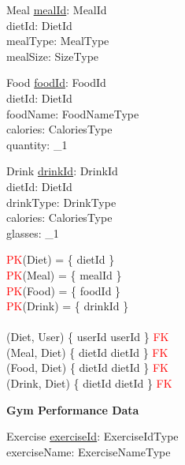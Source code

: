 \documentclass{article}
\begin{document}
\begin{schema}{Meal}
	\underline{mealId}: MealId \\
    dietId: DietId \\
    mealType: MealType \\
    mealSize: SizeType \\
\end{schema}

\begin{schema}{Food}
	\underline{foodId}: FoodId \\
    dietId: DietId \\
    foodName: FoodNameType \\
    calories: CaloriesType \\
    quantity: \nat_1 \\
\end{schema}

\begin{schema}{Drink}
	\underline{drinkId}: DrinkId \\
    dietId: DietId \\
    drinkType: DrinkType \\
    calories: CaloriesType \\
    glasses: \nat_1 \\
\end{schema}

\begin{zed}
\textcolor{red}{PK}(Diet) = \{ dietId \} \\
\textcolor{red}{PK}(Meal) = \{ mealId \} \\
\textcolor{red}{PK}(Food) = \{ foodId \} \\
\textcolor{red}{PK}(Drink) = \{ drinkId \} \\
\newline \\ 
(Diet, User) \mapsto \{ userId \mapsto userId \} \in \textcolor{red}{FK} \\
(Meal, Diet) \mapsto \{ dietId \mapsto dietId \} \in \textcolor{red}{FK} \\
(Food, Diet) \mapsto \{ dietId \mapsto dietId \} \in \textcolor{red}{FK} \\
(Drink, Diet) \mapsto \{ dietId \mapsto dietId \} \in \textcolor{red}{FK} \\
\end{zed}
    
\hspace{-0.5cm}\textbf{Gym Performance Data}

\begin{schema}{Exercise}
	\underline{exerciseId}: ExerciseIdType \\
	exerciseName: ExerciseNameType
\end{schema}
\end{document}
